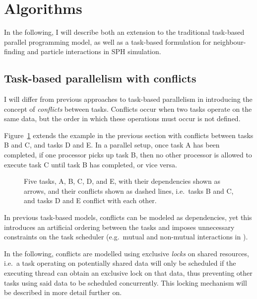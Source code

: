 \documentclass[final]{siamltex}
\newcommand{\fig}[1]
    {Figure~\ref{fig:#1}}
\begin{document}
\section{Algorithms}

In the following, I will describe both an extension to the
traditional task-based parallel programming model, as well
as a task-based formulation for neighbour-finding and 
particle interactions in SPH simulation.


\subsection{Task-based parallelism with conflicts}

I will differ from previous approaches to task-based parallelism
in introducing the concept of {\em conflicts} between tasks.
Conflicts occur when two tasks operate on the same data, 
but the order in which these operations must occur is not defined.

\fig{TasksExampleConflicts} extends the example in the
previous section with conflicts between tasks B and C, and tasks D and E.
In a parallel setup, once task A has been completed, if one processor
picks up task B, then no other processor is allowed to execute
task C until task B has completed, or vice versa.

\begin{figure}
    \centerline{}
    
    \caption{Five tasks, A, B, C, D, and E, with their dependencies
        shown as arrows, and their conflicts shown as dashed lines,
        i.e.~tasks B and C, and tasks D and E conflict with each
        other.}
    \label{fig:TasksExampleConflicts}
\end{figure}

In previous task-based models, conflicts can be modeled as dependencies,
yet this introduces an artificial ordering between the tasks
and imposes unnecessary constraints on the task scheduler
(e.g.~mutual and non-mutual interactions in \cite{ref:Ltaief2012}).

In the following, conflicts are modelled using exclusive {\em locks} on shared
resources, i.e.~a task operating on potentially shared data will
only be scheduled if the executing thread can obtain an exclusive
lock on that data,
thus preventing other tasks using said data to be scheduled concurrently.
This locking mechanism will be described in more detail further on.
\end{document}
